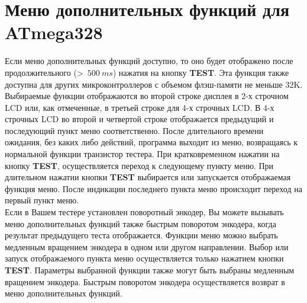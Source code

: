 \section{Меню дополнительных функций для ATmega328}
Если меню дополнительных функций доступно, то оно будет отображено после продолжительного (\textgreater~\(500~ms\)) нажатия 
на кнопку \textbf{ TEST}.
Эта функция также доступна для других микроконтроллеров с объемом флэш-памяти не меньше 32K.
Выбираемые функции отображаются во второй строке дисплея в 2-х строчном LCD или, как отмеченные, в третьей строке для 4-х строчных LCD.
В 4-х строчных LCD во второй и четвертой строке отображается предыдущий и последующий пункт меню соответственно.
После длительного времени ожидания, без каких либо действий, программа выходит из меню, возвращаясь к нормальной функции транзистор тестера.  
При кратковременном нажатии на кнопку \textbf{ TEST}, осуществляется переход к следующему пункту меню. 
При длительном нажатии кнопки \textbf{ TEST} выбирается или запускается отображаемая функция меню.
После индикации последнего пункта меню  происходит переход на первый пункт меню.\\

Если в Вашем тестере установлен поворотный энкодер, Вы можете вызывать меню дополнительных функций 
также быстрым поворотом энкодера, когда результат предыдущего теста отображается.
Функции меню можно выбрать медленным вращением энкодера в одном или другом направлении.
Выбор или запуск отображаемого пункта меню осуществляется только нажатием кнопки \textbf{ TEST}.
Параметры выбранной функции также могут быть выбраны медленным вращением энкодера.
Быстрым поворотом энкодера осуществляется возврат в меню дополнительных функций.

